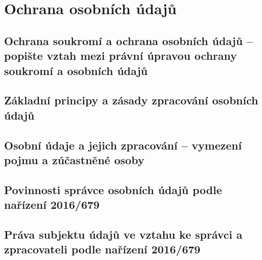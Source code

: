 \section{Ochrana osobních údajů}

\subsection{Ochrana soukromí a ochrana osobních údajů -- popište vztah mezi právní úpravou ochrany soukromí a osobních údajů}


\subsection{Základní principy a zásady zpracování osobních údajů}


\subsection{Osobní údaje a jejich zpracování -- vymezení pojmu a zúčastněné osoby}


\subsection{Povinnosti správce osobních údajů podle nařízení 2016/679}


\subsection{Práva subjektu údajů ve vztahu ke správci a zpracovateli podle nařízení 2016/679}
